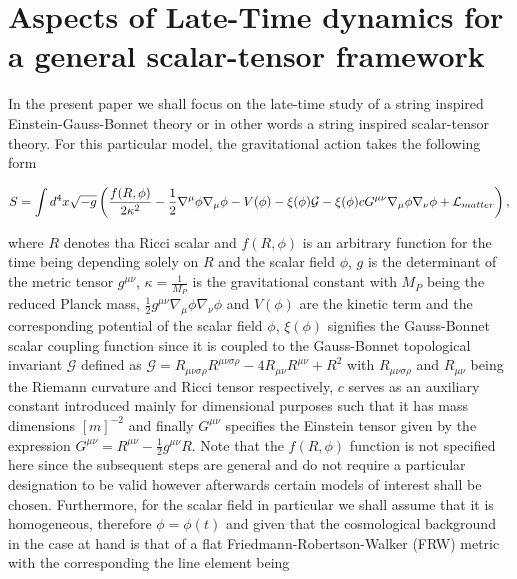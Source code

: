 \documentclass[aps,prd,twocolumn,groupedaddress,showpacs,nofootinbib,amssymb]{revtex4-2}
\begin{document}
\section{Aspects of Late-Time dynamics for a general scalar-tensor framework}
In the present paper we shall focus on the late-time study of a string inspired Einstein-Gauss-Bonnet theory or in other words a string inspired scalar-tensor theory. For this particular model, the gravitational action takes the following form

\begin{widetext}
\begin{equation}
\centering
\label{action}
S=\int{d^4x\sqrt{-g}\left(\frac{f(R,\phi)}{2\kappa^2}-\frac{1}{2}\nabla^\mu\phi\nabla_\mu\phi-V(\phi)-\xi(\phi)\mathcal{G}-\xi(\phi)cG^{\mu\nu}\nabla_\mu\phi\nabla_\nu\phi+\mathcal{L}_{matter}\right)}\, ,
\end{equation}
\end{widetext}
where $R$ denotes tha Ricci scalar and $f(R,\phi)$ is an arbitrary function for the time being depending solely on $R$ and the scalar field $\phi$, $g$ is the determinant of the metric tensor $g^{\mu\nu}$, $\kappa=\frac{1}{M_P}$ is the gravitational constant with $M_P$ being the reduced Planck mass, $\frac{1}{2}g^{\mu\nu}\nabla_\mu\phi\nabla_\nu\phi$ and $V(\phi)$ are the kinetic term and the corresponding potential of the scalar field $\phi$, $\xi(\phi)$ signifies the Gauss-Bonnet scalar coupling function since it is coupled to the Gauss-Bonnet topological invariant $\mathcal{G}$ defined as $\mathcal{G}=R_{\mu\nu\sigma\rho}R^{\mu\nu\sigma\rho}-4R_{\mu\nu}R^{\mu\nu}+R^2$ with $R_{\mu\nu\sigma\rho}$ and $R_{\mu\nu}$ being the Riemann curvature and Ricci tensor respectively, $c$ serves as an auxiliary constant introduced mainly for dimensional purposes such that it has mass dimensions $[m]^{-2}$ and finally $G^{\mu\nu}$ specifies the Einstein tensor given by the expression $G^{\mu\nu}=R^{\mu\nu}-\frac{1}{2}g^{\mu\nu}R$. Note that the $f(R,\phi)$ function is not specified here since the subsequent steps are general and do not require a particular designation to be valid however afterwards certain models of interest shall be chosen. Furthermore, for the scalar field in particular we shall assume that it is homogeneous, therefore $\phi=\phi(t)$ and given that the cosmological background in the case at hand is that of a flat Friedmann-Robertson-Walker (FRW) metric with the corresponding the line element being
\end{document}
